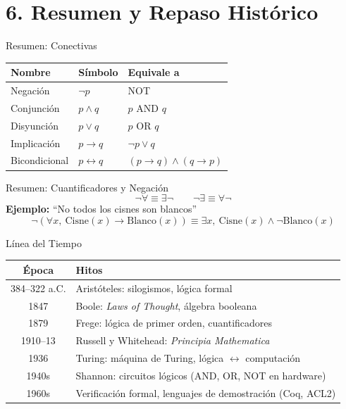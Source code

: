 \documentclass[aspectratio=169,10pt]{beamer}
\begin{document}
\section{6. Resumen y Repaso Histórico}

\begin{frame}{Resumen: Conectivas}
\begin{tabular}{lll}
\textbf{Nombre} & \textbf{Símbolo} & \textbf{Equivale a} \\ \hline
Negación & $\neg p$ & NOT \\
Conjunción & $p \land q$ & $p$ AND $q$ \\
Disyunción & $p \lor q$ & $p$ OR $q$ \\
Implicación & $p \to q$ & $\neg p \lor q$ \\
Bicondicional & $p \leftrightarrow q$ & $(p\to q)\land(q\to p)$
\end{tabular}
\end{frame}

\begin{frame}{Resumen: Cuantificadores y Negación}
\[
\boxed{\neg\forall \equiv \exists\neg \qquad \neg\exists \equiv \forall\neg}
\]
\textbf{Ejemplo:} ``No todos los cisnes son blancos''
\[
\neg(\forall x,\ \text{Cisne}(x) \to \text{Blanco}(x)) \equiv \exists x,\ \text{Cisne}(x) \land \neg\text{Blanco}(x)
\]
\end{frame}

\begin{frame}{Línea del Tiempo}
\begin{tabular}{cl}
\textbf{Época} & \textbf{Hitos} \\ \hline
\scriptsize 384--322 a.C. & Aristóteles: silogismos, lógica formal \\
\scriptsize 1847 & Boole: \textit{Laws of Thought}, álgebra booleana \\
\scriptsize 1879 & Frege: lógica de primer orden, cuantificadores \\
\scriptsize 1910--13 & Russell y Whitehead: \textit{Principia Mathematica} \\
\scriptsize 1936 & Turing: máquina de Turing, lógica $\leftrightarrow$ computación \\
\scriptsize 1940s & Shannon: circuitos lógicos (AND, OR, NOT en hardware) \\
\scriptsize 1960s & Verificación formal, lenguajes de demostración (Coq, ACL2)
\end{tabular}
\end{frame}
\end{document}
